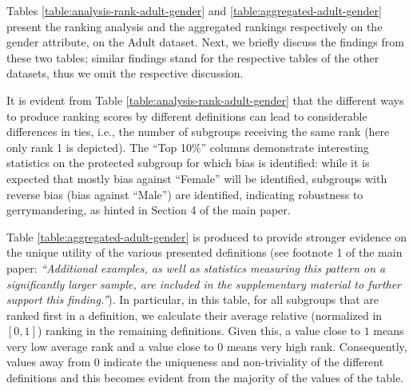 \documentclass{article}
\begin{document}
Tables \ref{table:analysis-rank-adult-gender} and \ref{table:aggregated-adult-gender} present the ranking analysis and the aggregated rankings respectively on the gender attribute, on the Adult dataset. Next, we briefly discuss the findings from these two tables; similar findings stand for the respective tables of the other datasets, thus we omit the respective discussion.


It is evident from Table \ref{table:analysis-rank-adult-gender} that the different ways to produce ranking scores by different definitions can lead to considerable differences in ties, i.e., the number of subgroups receiving the same rank (here  only rank 1 is depicted). The ``Top 10$\%$'' columns demonstrate interesting statistics on the protected subgroup for which bias is identified: while it is expected that mostly bias against ``Female'' will be identified, subgroups with reverse bias (bias against ``Male'') are identified, indicating robustness to gerrymandering, as hinted in Section 4 of the main paper.

Table \ref{table:aggregated-adult-gender} is produced to provide stronger evidence on the unique utility of the various presented definitions (see footnote 1 of the main paper: \textit{``Additional examples, as well as statistics measuring this pattern on a significantly larger sample, are included
in the supplementary material to further support this finding.''}). In particular, in this table,
for all subgroups that are ranked first in a definition, we calculate their average relative (normalized in $[0,1]$) ranking in the remaining definitions. Given this, a value close to $1$ means very low average rank and a value close to $0$ means very high rank. Consequently, values away from $0$ indicate the uniqueness and non-triviality of the different definitions and this becomes evident from the majority of the values of the table.  


\end{document}
